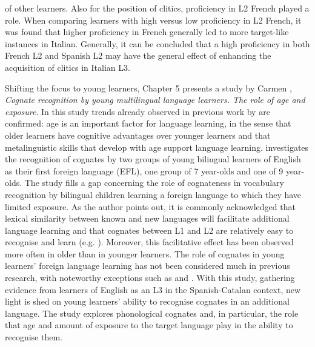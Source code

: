 \documentclass[output=paper,colorlinks,citecolor=brown,nonflat]{langsci/langscibook}
\begin{document}
of other learners. Also for the position of clitics, proficiency in L2 French played a role. When comparing learners with high versus low proficiency in L2 French, it was found that higher proficiency in French generally led to more target-like instances in Italian. Generally, it can be concluded that a high proficiency in both French L2 and Spanish L2 may have the general effect of enhancing the acquisition of clitics in Italian L3.

Shifting the focus to young learners, Chapter 5 presents a study by Carmen \citeauthor{chapters/munoz}, \textit{Cognate recognition by young multilingual language learners. The role of age and exposure}. In this study trends already observed in previous work by \citet{Muñoz2006Book, Muñoz2014Complexities} are confirmed: age is an important factor for language learning, in the sense that older learners have cognitive advantages over younger learners and that metalinguistic skills that develop with age support language learning. \citeauthor{chapters/munoz} investigates the recognition of cognates by two groups of young bilingual learners of English as their first foreign language (EFL), one group of 7 year-olds and one of 9 year-olds. The study fills a gap concerning the role of cognateness in vocabulary recognition by bilingual children learning a foreign language to which they have limited exposure. As the author points out, it is commonly acknowledged that lexical similarity between known and new languages will facilitate additional language learning \citep{Ringbom2007} and that cognates between L1 and L2 are relatively easy to recognise and learn (e.g. \citealt{EllisNBeaton1993, DeGrootvanHell2005}). Moreover, this facilitative effect has been observed more often in older than in younger learners. The role of cognates in young learners’ foreign language learning has not been considered much in previous research, with noteworthy exceptions such as \citet{Otwinowska2016} and \citet{GoriotEtAl2018}. With this study, gathering evidence from learners of English as an L3 in the Spanish-Catalan context, new light is shed on young learners’ ability to recognise cognates in an additional language. The study explores phonological cognates and, in particular, the role that age and amount of exposure to the target language play in the ability to recognise them.
\end{document}
